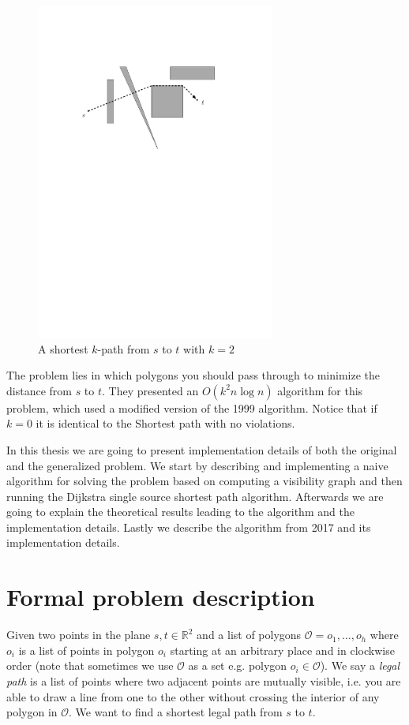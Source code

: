 \begin{figure}[H]
    \centering
	\includegraphics[width=0.7\textwidth]{figures/shortestkpath.pdf}
	\caption{A shortest $k$-path from $s$ to $t$ with $k = 2$}
     \label{fig:shortestkpath}
\end{figure}

The problem lies in which polygons you should pass through to minimize the distance from
$s$ to $t$. They presented an $O(k^2 n\log n)$ algorithm for this problem,
which used a modified version of the 1999 algorithm\cite{HershbergerKS17}.
Notice that if $k = 0$ it is identical to the Shortest path with no violations.

In this thesis we are going to present implementation details of both the original
and the generalized problem. We start by describing and implementing a naive algorithm 
for solving the problem based on computing a visibility graph and then running the Dijkstra
single source shortest path algorithm. Afterwards we are going to explain the theoretical
results leading to the algorithm and the implementation details. Lastly we describe the 
algorithm from 2017 and its implementation details.

\section{Formal problem description} 
\label{problemdescription}
Given two points in the plane $s,t\in\mathbb{R}^2$ and a list of polygons
$\mathcal{O}=o_1,\dots,o_h$ where $o_i$ is a list of points in polygon $o_i$
starting at an arbitrary place and in clockwise order (note that sometimes we
use $\mathcal{O}$ as a set e.g. polygon $o_i \in \mathcal{O}$). We say a
\emph{legal path} is a list of points where two adjacent points are mutually
visible, i.e. you are able to draw a line from one to the other without
crossing the interior of any polygon in $\mathcal{O}$.  We want to find a shortest legal
path from $s$ to $t$.

